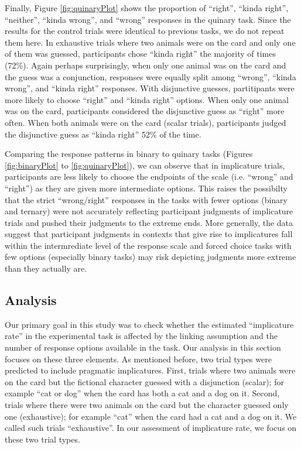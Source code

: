 \documentclass[floatsintext,man]{apa6}
\theoremstyle{definition}
\theoremstyle{definition}
\theoremstyle{definition}
\theoremstyle{remark}
\begin{document}
Finally, Figure \ref{fig:quinaryPlot} shows the proportion of
\enquote{right}, \enquote{kinda right}, \enquote{neither},
\enquote{kinda wrong}, and \enquote{wrong} responses in the quinary
task. Since the results for the control trials were identical to
previous tasks, we do not repeat them here. In exhaustive trials where
two animals were on the card and only one of them was guessed,
participants chose \enquote{kinda right} the majority of times (72\%).
Again perhaps surprisingly, when only one animal was on the card and the
guess was a conjunction, responses were equally split among
\enquote{wrong}, \enquote{kinda wrong}, and \enquote{kinda right}
responses. With disjunctive guesses, partitipants were more likely to
choose \enquote{right} and \enquote{kinda right} options. When only one
animal was on the card, participants considered the disjunctive guess as
\enquote{right} more often. When both animals were on the card (scalar
trials), participants judged the disjunctive guess as \enquote{kinda
right} 52\% of the time.

Comparing the response patterns in binary to quinary tasks (Figures
\ref{fig:binaryPlot} to \ref{fig:quinaryPlot}), we can observe that in
implicature trials, participants are less likely to choose the endpoints
of the scale (i.e. \enquote{wrong} and \enquote{right}) as they are
given more intermediate options. This raises the possibilty that the
strict \enquote{wrong/right} responses in the tasks with fewer options
(binary and ternary) were not accurately reflecting participant
judgments of implicature trials and pushed their judgments to the
extreme ends. More generally, the data suggest that participant
judgments in contexts that give rise to implicatures fall within the
intermrediate level of the response scale and forced choice tasks with
few options (especially binary tasks) may risk depicting judgments more
extreme than they actually are.

\subsection{Analysis}\label{analysis}

Our primary goal in this study was to check whether the estimated
\enquote{implicature rate} in the experimental task is affected by the
linking assumption and the number of response options available in the
task. Our analysis in this section focuses on these three elements. As
mentioned before, two trial types were predicted to include pragmatic
implicatures. First, trials where two animals were on the card but the
fictional character guessed with a disjunction (scalar); for example
\enquote{cat or dog} when the card has both a cat and a dog on it.
Second, trials where there were two animals on the card but the
character guessed only one (exhaustive); for example \enquote{cat} when
the card had a cat and a dog on it. We called such trials
\enquote{exhaustive}. In our assessment of implicature rate, we focus on
these two trial types.
\end{document}
